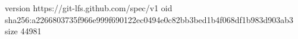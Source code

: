 version https://git-lfs.github.com/spec/v1
oid sha256:a2266803735f966e999f690122ec0494e0c82bb3bed1b4f068df1b983d903ab3
size 44981

